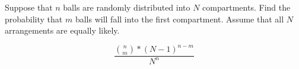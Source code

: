 \item Suppose that $n$ balls are randomly distributed into $N$ compartments. Find the probability that $m$ balls will fall into the first compartment. Assume that all $N$ arrangements are equally likely.

\[ \frac{\binom{n}{m} * (N-1)^{n-m}}{N^n} \]
